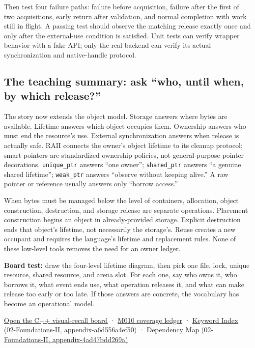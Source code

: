 Then test four failure paths: failure before acquisition, failure after the first of two acquisitions, early return after validation, and normal completion with work still in flight. A passing test should observe the matching release exactly once and only after the external-use condition is satisfied. Unit tests can verify wrapper behavior with a fake API; only the real backend can verify its actual synchronization and native-handle protocol.

\subsection{The teaching summary: ask ``who, until when, by which release?''}\label{01-foundations-i-ch004-the-teaching-summary-ask-who-until-when-by-which-release}

The story now extends the object model. Storage answers where bytes are available. Lifetime answers which object occupies them. Ownership answers who must end the resource's use. External synchronization answers when release is actually safe. RAII connects the owner's object lifetime to its cleanup protocol; smart pointers are standardized ownership policies, not general-purpose pointer decorations. \texttt{unique\_ptr} answers ``one owner''; \texttt{shared\_ptr} answers ``a genuine shared lifetime''; \texttt{weak\_ptr} answers ``observe without keeping alive.'' A raw pointer or reference usually answers only ``borrow access.''

When bytes must be managed below the level of containers, allocation, object construction, destruction, and storage release are separate operations. Placement construction begins an object in already-provided storage. Explicit destruction ends that object's lifetime, not necessarily the storage's. Reuse creates a new occupant and requires the language's lifetime and replacement rules. None of these low-level tools removes the need for an owner ledger.

\textbf{Board test:} draw the four-level lifetime diagram, then pick one file, lock, unique resource, shared resource, and arena slot. For each one, say who owns it, who borrows it, what event ends use, what operation releases it, and what can make release too early or too late. If those answers are concrete, the vocabulary has become an operational model.

\hyperref[appendix-960160274237]{Open the C++ visual-recall board} · \hyperref[appendix-fd090d982a15-m010---parts-148-160]{M010 coverage ledger} · \href{../02-Foundations-II/main.pdf\#nameddest=appendix-a6d556a4ef50}{Keyword Index (02-Foundations-II, appendix-a6d556a4ef50)} · \href{../02-Foundations-II/main.pdf\#nameddest=appendix-4ad47bdd269a}{Dependency Map (02-Foundations-II, appendix-4ad47bdd269a)}


